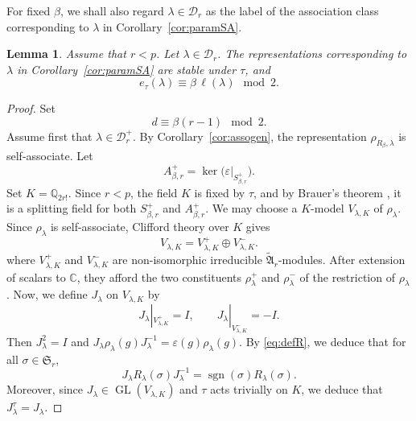 \documentclass[reqno]{amsart}
\DeclareMathOperator{\GL}{GL}
\DeclareMathOperator{\sgn}{sgn}
\newcommand{\sym}{\mathfrak{S}}
\newcommand{\alt}{\mathfrak{A}}
\newcommand{\C}{\mathbb{C}}
\newcommand{\Q}{\mathbb{Q}}
\newtheorem{lemma}[theorem]{Lemma}     %
\theoremstyle{definition}
\begin{document}
For fixed $\beta$, we shall also regard $\lambda\in\mathcal D_r$ as the
label of the association class corresponding to $\lambda$ in
Corollary~\ref{cor:paramSA}.

\begin{lemma}
\label{lem:galois-D}
Assume that $r<p$. Let $\lambda\in\mathcal D_r$. The representations
corresponding to $\lambda$ in Corollary~\ref{cor:paramSA} are stable under
$\tau$, and
\[
e_\tau(\lambda)
\equiv
\beta\,\ell(\lambda)
\mod2.
\]
\end{lemma}

\begin{proof}
Set
\[
d\equiv \beta(r-1)\mod2.
\]
Assume first that $\lambda\in\mathcal D_r^+$. By
Corollary~\ref{cor:assogen}, the representation
$\rho_{R_\beta,\lambda}$ is self-associate. 
Let
\[
A_{\beta,r}^+=\ker\bigl(\varepsilon|_{S_{\beta,r}^+}\bigr).
\]
Set $K=\Q_{2r!}$. Since $r<p$, the field $K$ is fixed by $\tau$, and
by Brauer's theorem \cite[Theorem (10.3)]{isaacs}, it is a splitting
field for both $S_{\beta,r}^+$ and $A_{\beta,r}^+$. We may choose a
$K$-model $V_{\lambda,K}$ of $\rho_\lambda$. Since $\rho_\lambda$ is
self-associate, Clifford theory over $K$ gives
\[
V_{\lambda,K}
=
V_{\lambda,K}^+\oplus V_{\lambda,K}^-.
\]
where $V_{\lambda,K}^+$ and $V_{\lambda,K}^-$ are non-isomorphic
irreducible $\widetilde{\alt}_r$-modules. After extension of scalars to
$\C$, they afford the two constituents $\rho_\lambda^+$ and
$\rho_\lambda^-$ of the restriction of $\rho_\lambda$.
Now, we define $J_\lambda$ on $V_{\lambda,K}$
by
\[
J_\lambda|_{V_{\lambda,K}^+}=I,
\qquad
J_\lambda|_{V_{\lambda,K}^-}=-I.
\]
Then $J_\lambda^2=I$ and $ J_\lambda \rho_\lambda(g)J_\lambda^{-1} =
\varepsilon(g)\rho_\lambda(g) $. By \eqref{eq:defR}, we deduce that for
all $\sigma\in \sym_r$,
\begin{equation}
\label{eq:locrel}
J_\lambda R_\lambda(\sigma)
J_\lambda^{-1}=\sgn(\sigma)R_\lambda(\sigma).
\end{equation}
Moreover, since $J_\lambda\in \GL(V_{\lambda,K})$ and $\tau$ acts trivially
on $K$, we deduce that $ J_\lambda^\tau=J_\lambda $.


\end{proof}
\end{document}
